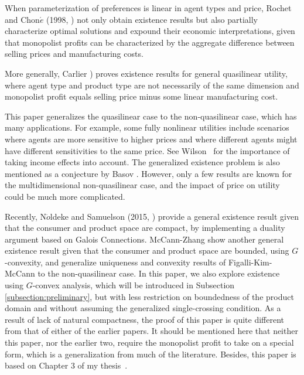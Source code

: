 \documentclass[a4paper, 11pt]{amsart}
\numberwithin{equation}{section}
\theoremstyle{plain}
\theoremstyle{definition}
\theoremstyle{remark}
\begin{document}
When parameterization of preferences is linear in agent types and price, Rochet and Chon$\acute{e}$ (1998, \cite{RochetChone98}) not only obtain existence results but also partially characterize optimal solutions and expound their economic interpretations, %
given that monopolist profits can be characterized by {the aggregate difference between selling prices and manufacturing costs.}\medskip

More generally, Carlier \cite{Carlier01}) proves existence results for general quasilinear utility, where agent type and product type are not necessarily of the same dimension and monopolist profit equals selling price minus some linear manufacturing cost.\medskip

This paper generalizes the quasilinear case to the non-quasilinear case, which has many applications. For example, some fully nonlinear utilities include scenarios where agents are more sensitive to higher prices and where different agents might have different sensitivities to the same price. %
See Wilson~\cite[Chapter 7]{Wilson93} for the importance of taking income effects into account. 
The generalized existence problem is also mentioned as a conjecture by Basov \cite[Chapter~8]{Basov05}. However, only a few results are known for the multidimensional non-quasilinear case, and the impact of price on utility could be much more complicated.\medskip


Recently, N$\ddot{o}$ldeke and Samuelson (2015, \cite{NoldekeSamuelson15p}) provide a general existence result given that the consumer and product space are compact, by implementing a duality argument based on Galois Connections. McCann-Zhang \cite{McCannZhang17} show another general existence result given that the consumer and product space are bounded, using $G$-convexity, and generalize uniqueness and convexity results of Figalli-Kim-McCann \cite{FigalliKimMcCann11} to the non-quasilinear case. In this paper, we also explore existence using $G$-convex analysis, which will be introduced in Subsection \ref{subsection:preliminary}, but with less restriction on boundedness of the product domain and without assuming the generalized single-crossing condition. As a result of lack of natural compactness, the proof of this paper is quite different from that of either of the %
 earlier papers. It should be mentioned here that {neither} this paper, %
{nor the earlier two}, %
require the monopolist profit to take on a special form, which is a generalization from much of the literature. Besides, this paper is based on Chapter 3 of my thesis~\cite{Zhang18}.\medskip
\end{document}
